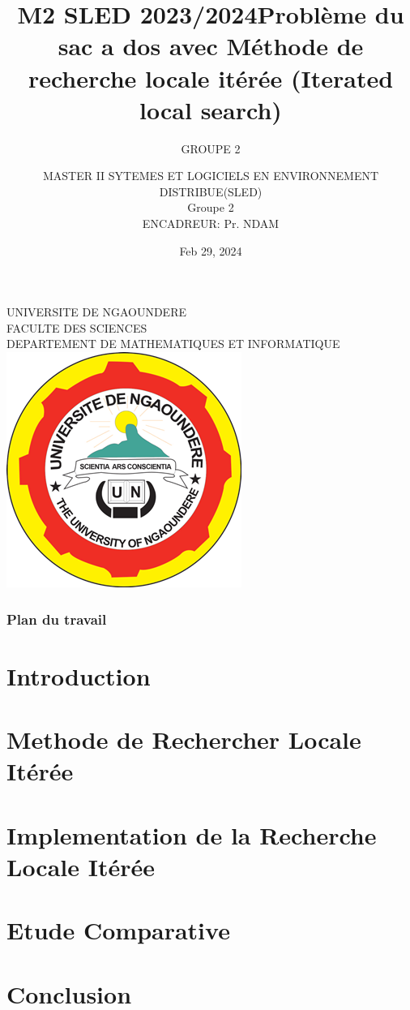 \documentclass[11pt]{beamer}
\begin{document}
	\author{GROUPE 2}
	\title{M2 SLED 2023/2024}
	\subtitle{}
	\institute{}
	\date{\tiny Feb 29,  2024}
	\subject{}
	\begin{frame}[plain]
		\title{ {\small Problème du sac a dos avec Méthode de recherche locale itérée (Iterated local search)}}
		\author{{\tiny MASTER II SYTEMES ET LOGICIELS EN ENVIRONNEMENT DISTRIBUE(SLED)}\\ {\tiny Groupe 2}\\ {\tiny ENCADREUR: Pr. NDAM } }

		\begin{center}	
			{\footnotesize	UNIVERSITE DE NGAOUNDERE }	\\
		 {\tiny FACULTE DES SCIENCES }\\
		 {\tiny DEPARTEMENT DE MATHEMATIQUES ET INFORMATIQUE}\\
	 		\includegraphics[scale=0.1]{image}\\
	 \end{center}
		\maketitle
		 
	\end{frame}
	
	\begin{frame}
		\frametitle{Plan du travail}
		\tableofcontents
		\section{Introduction}
		\section{Methode de Rechercher Locale Itérée}
		\section{Implementation de la Recherche Locale Itérée}
		\section{Etude Comparative}
		\section{Conclusion}
	\end{frame}
\end{document}
